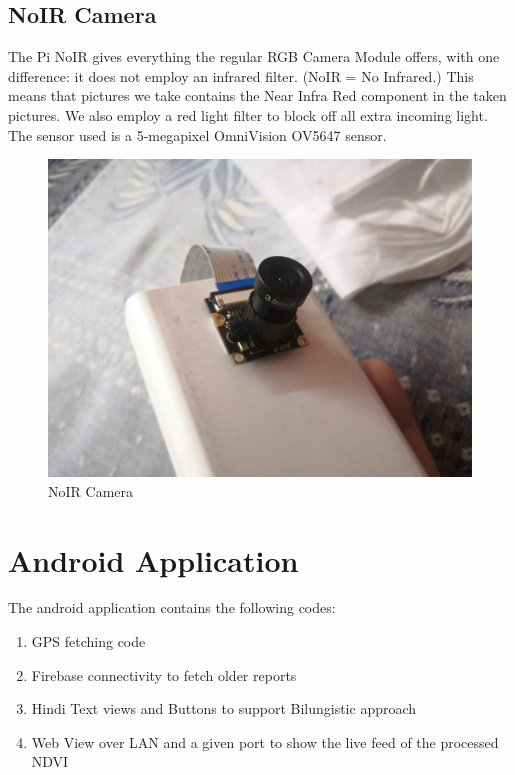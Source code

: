 \subsection{NoIR Camera}
The Pi NoIR gives everything the regular RGB Camera Module offers, with one difference: it does not employ an infrared filter. (NoIR = No Infrared.) This means that pictures we take contains the Near Infra Red component in the taken pictures. We also employ a red light filter to block off all extra incoming light. The sensor used is a 5-megapixel OmniVision OV5647 sensor.
\begin{figure}[H]
    \centering
    \includegraphics[width=0.7\linewidth]{SummerInterReport/project/Images-Major/pi_bottom.jpeg}
    \caption{NoIR Camera}
    \label{fig:compEy}
\end{figure}
\section{Android Application}
The android application contains the following codes:
\begin{enumerate}
    \item GPS fetching code
    \item Firebase connectivity to fetch older reports
    \item Hindi Text views and Buttons to support Bilungistic approach
    \item Web View over LAN and a given port to show the live feed of the processed NDVI
\end{enumerate}